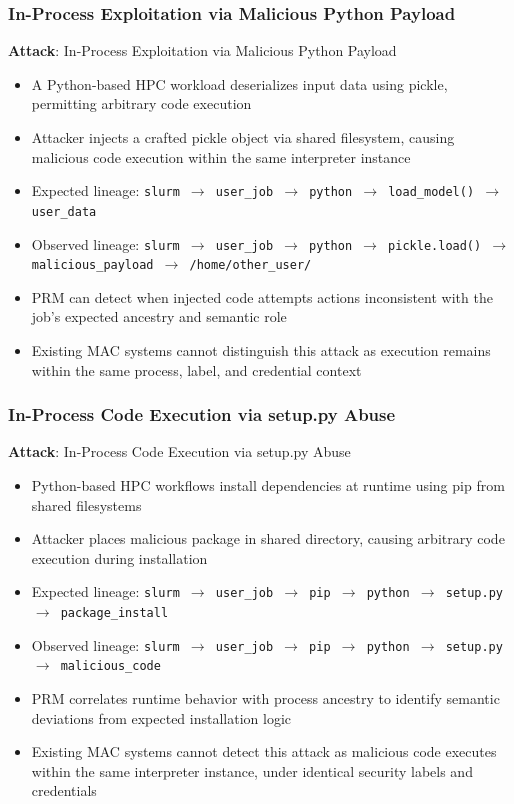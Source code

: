\documentclass[]{sn-jnl}
\begin{document}
\subsubsection{In-Process Exploitation via Malicious Python Payload}

\textbf{Attack}: In-Process Exploitation via Malicious Python Payload
\begin{itemize}
\item A Python-based HPC workload deserializes input data using pickle, permitting
      arbitrary code execution
\item Attacker injects a crafted pickle object via shared filesystem, causing
      malicious code execution within the same interpreter instance
\item Expected lineage: \texttt{slurm $\rightarrow$ user\_job $\rightarrow$ python $\rightarrow$ load\_model() $\rightarrow$ user\_data}
\item Observed lineage: \texttt{slurm $\rightarrow$ user\_job $\rightarrow$ python $\rightarrow$ pickle.load() $\rightarrow$ malicious\_payload $\rightarrow$ /home/other\_user/}
\item PRM can detect when injected code attempts actions inconsistent with the
      job's expected ancestry and semantic role
\item Existing MAC systems cannot distinguish this attack as execution remains
      within the same process, label, and credential context
\end{itemize}

\subsubsection{In-Process Code Execution via setup.py Abuse}

\textbf{Attack}: In-Process Code Execution via setup.py Abuse
\begin{itemize}
\item Python-based HPC workflows install dependencies at runtime using pip from
      shared filesystems
\item Attacker places malicious package in shared directory, causing arbitrary code
      execution during installation
\item Expected lineage: \texttt{slurm $\rightarrow$ user\_job $\rightarrow$ pip $\rightarrow$ python $\rightarrow$ setup.py $\rightarrow$ package\_install}
\item Observed lineage: \texttt{slurm $\rightarrow$ user\_job $\rightarrow$ pip $\rightarrow$ python $\rightarrow$ setup.py $\rightarrow$ malicious\_code}
\item PRM correlates runtime behavior with process ancestry to identify semantic
      deviations from expected installation logic
\item Existing MAC systems cannot detect this attack as malicious code executes
      within the same interpreter instance, under identical security labels and
      credentials
\end{itemize}
\end{document}
